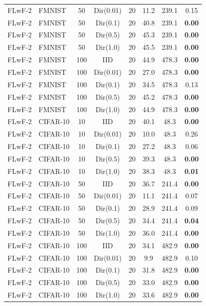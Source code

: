 \begin{table}[t]
\begin{tabular}{llcccccc}
FLwF-2 & FMNIST   &  50 & Dir(0.01) & 20 &  11.2 &  239.1 & 0.15 \\
FLwF-2 & FMNIST   &  50 & Dir(0.1)  & 20 &  40.8 &  239.1 & \textbf{0.00} \\
FLwF-2 & FMNIST   &  50 & Dir(0.5)  & 20 &  45.3 &  239.1 & \textbf{0.00} \\
FLwF-2 & FMNIST   &  50 & Dir(1.0)  & 20 &  45.5 &  239.1 & \textbf{0.00} \\
FLwF-2 & FMNIST   & 100 & IID       & 20 &  44.9 &  478.3 & \textbf{0.00} \\
FLwF-2 & FMNIST   & 100 & Dir(0.01) & 20 &  27.0 &  478.3 & \textbf{0.00} \\
FLwF-2 & FMNIST   & 100 & Dir(0.1)  & 20 &  34.5 &  478.3 & 0.13 \\
FLwF-2 & FMNIST   & 100 & Dir(0.5)  & 20 &  45.2 &  478.3 & \textbf{0.00} \\
FLwF-2 & FMNIST   & 100 & Dir(1.0)  & 20 &  44.9 &  478.3 & \textbf{0.00} \\
\midrule
FLwF-2 & CIFAR-10 &  10 & IID       & 20 &  40.1 &   48.3 & \textbf{0.00} \\
FLwF-2 & CIFAR-10 &  10 & Dir(0.01) & 20 &  10.0 &   48.3 & 0.26 \\
FLwF-2 & CIFAR-10 &  10 & Dir(0.1)  & 20 &  27.2 &   48.3 & 0.06 \\
FLwF-2 & CIFAR-10 &  10 & Dir(0.5)  & 20 &  39.3 &   48.3 & \textbf{0.00} \\
FLwF-2 & CIFAR-10 &  10 & Dir(1.0)  & 20 &  38.3 &   48.3 & \textbf{0.01} \\
FLwF-2 & CIFAR-10 &  50 & IID       & 20 &  36.7 &  241.4 & \textbf{0.00} \\
FLwF-2 & CIFAR-10 &  50 & Dir(0.01) & 20 &  11.1 &  241.4 & 0.07 \\
FLwF-2 & CIFAR-10 &  50 & Dir(0.1)  & 20 &  28.9 &  241.4 & 0.09 \\
FLwF-2 & CIFAR-10 &  50 & Dir(0.5)  & 20 &  34.4 &  241.4 & \textbf{0.04} \\
FLwF-2 & CIFAR-10 &  50 & Dir(1.0)  & 20 &  36.0 &  241.4 & \textbf{0.00} \\
FLwF-2 & CIFAR-10 & 100 & IID       & 20 &  34.1 &  482.9 & \textbf{0.00} \\
FLwF-2 & CIFAR-10 & 100 & Dir(0.01) & 20 &   9.9 &  482.9 & 0.10 \\
FLwF-2 & CIFAR-10 & 100 & Dir(0.1)  & 20 &  31.8 &  482.9 & \textbf{0.00} \\
FLwF-2 & CIFAR-10 & 100 & Dir(0.5)  & 20 &  33.0 &  482.9 & \textbf{0.00} \\
FLwF-2 & CIFAR-10 & 100 & Dir(1.0)  & 20 &  33.6 &  482.9 & \textbf{0.00} \\
\bottomrule
\end{tabular}
\end{table}
